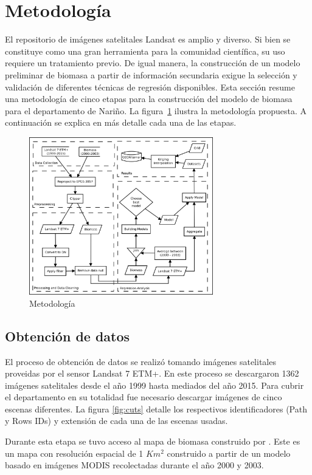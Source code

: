 
\section{Metodología}
El repositorio de imágenes satelitales Landsat es amplio y diverso.  Si bien se constituye como una gran herramienta para la comunidad científica, su uso requiere un tratamiento previo.  De igual manera, la construcción de un modelo preliminar de biomasa a partir de información secundaria exigue la selección y validación de diferentes técnicas de regresión disponibles.  Esta sección resume una metodología de cinco etapas para la construcción del modelo de biomasa para el departamento de Nariño.  La figura~\ref{fig:metodology} ilustra la metodología propuesta. A continuación se explica en más detalle cada una de las etapas.

\begin{figure}
  \centering
  \includegraphics[width = 8cm]{metodology.png}
  \caption{Metodología}
  \label{fig:metodology}
\end{figure}

\subsection{Obtención de datos}

El proceso de obtención de datos se realizó tomando imágenes satelitales proveidas por el sensor Landsat 7 ETM+. En este proceso se descargaron 1362 imágenes satelitales desde el año 1999 hasta mediados del año 2015. Para cubrir el departamento en su totalidad fue necesario descargar imágenes de cinco escenas diferentes.  La figura \ref{fig:cuts} detalle los respectivos identificadores (Path y Rows IDs) y extensión de cada una de las escenas usadas.

Durante esta etapa se tuvo acceso al mapa de biomasa construido por \cite{baccini2008afirst}.  Este es un mapa con resolución espacial de 1 $Km^2$ construido a partir de un modelo basado en imágenes MODIS recolectadas durante el año 2000 y 2003.

